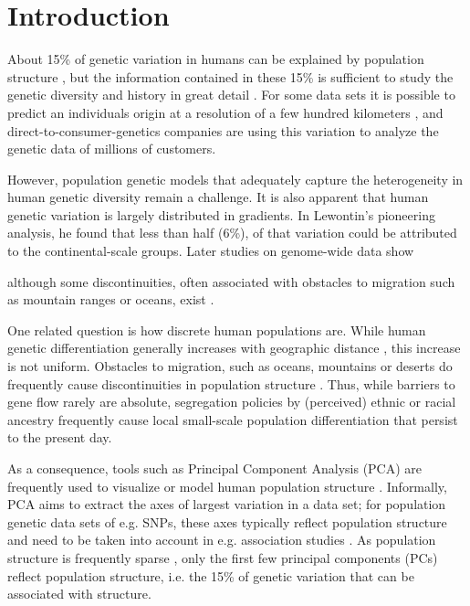 \documentclass[12pt,a4pape, fullpage]{article}
\begin{document}
\section{Introduction}
About 15\% of genetic variation in humans can be explained by population structure \cite{lewontin1972, barbujani1997, rosenberg2003}, but the information contained in these 15\% is sufficient to study the genetic diversity and history in great detail \cite{cavalli-sforza1994, edwards2003}. For some data sets it is possible to predict an individuals origin at a resolution of a few hundred kilometers \cite{novembre2008, leslie2015}, and direct-to-consumer-genetics companies are using this variation to analyze the genetic data of millions of customers.

However, population genetic models that adequately capture the heterogeneity in human genetic diversity remain a challenge. 
It is also apparent that human genetic variation is largely distributed in gradients.
In Lewontin's pioneering analysis, he found that less than half (6\%), of that variation could be attributed to the continental-scale groups. Later studies on genome-wide data show 

although some discontinuities, often associated with obstacles to migration such as mountain ranges or oceans, exist \cite{serre2004, ramachandran2005, rosenberg2007, peter2020}. 

One related question is how discrete human populations are. While human genetic differentiation generally increases with geographic distance \cite{ramachandran2005, rosenberg2007}, this increase is not uniform. Obstacles to migration,  such as oceans, mountains or deserts do frequently cause discontinuities in population structure \cite{peter2020a}. Thus, while barriers to gene flow rarely are absolute, segregation policies by (perceived) ethnic or racial ancestry frequently cause local small-scale population differentiation that persist to the present day.

As a consequence, tools such as Principal Component Analysis (PCA) are frequently used to visualize or model human population structure \citep{cavalli-sforza1964, cavalli-sforza1994}. Informally, PCA aims to extract the axes of largest variation in a data set; for population genetic data sets of e.g. SNPs, these axes typically reflect population structure and need to be taken into account in e.g. association studies \citep{price2006}. As population structure is frequently sparse \cite{engelhardt2010, mcvean2009}, only the first few principal components (PCs) reflect population structure, i.e. the 15\% of genetic variation that can be associated with structure.
\end{document}
